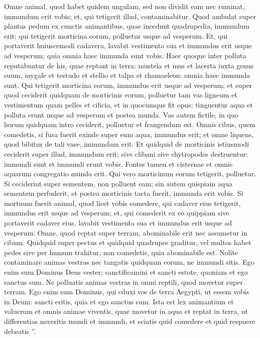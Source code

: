 \begin{biblechapter}
\begin{biblechapter}
\begin{biblechapter}
\begin{biblechapter}
\begin{biblechapter}
\begin{biblechapter}
\begin{biblechapter}
\begin{biblechapter}
\begin{biblechapter}
\begin{biblechapter}
\begin{biblechapter}
 \verse Omne animal, quod habet quidem ungulam, sed non dividit eam nec ruminat, immundum erit vobis; et, qui tetigerit illud, contaminabitur. 
\verse Quod ambulat super plantas pedum ex cunctis animantibus, quae incedunt quadrupedia, immundum erit; qui tetigerit morticina eorum, polluetur usque ad vesperum. 
 \verse Et, qui portaverit huiuscemodi cadavera, lavabit vestimenta sua et immundus erit usque ad vesperum; quia omnia haec immunda sunt vobis.
 \verse Haec quoque inter polluta reputabuntur de his, quae reptant in terra: mustela et mus et lacerta iuxta genus suum, 
\verse mygale et testudo et stellio et talpa et chamaeleon: 
\verse omnia haec immunda sunt.
 Qui tetigerit morticina eorum, immundus erit usque ad vesperum; 
\verse et super quod ceciderit quidquam de morticinis eorum, polluetur tam vas ligneum et vestimentum quam pelles et cilicia, et in quocumque fit opus; tinguentur aqua et polluta erunt usque ad vesperum et postea munda. 
\verse Vas autem fictile, in quo horum quidquam intro ceciderit, polluetur et frangendum est. 
\verse Omnis cibus, quem comedetis, si fusa fuerit exinde super eum aqua, immundus erit; et omne liquens, quod bibitur de tali vase, immundum erit. 
\verse Et quidquid de morticinis istiusmodi ceciderit super illud, immundum erit; sive clibani sive chytropodes destruentur: immundi sunt et immundi erunt vobis. 
\verse Fontes tamen et cisternae et omnis aquarum congregatio munda erit. Qui vero morticinum eorum tetigerit, polluetur. 
\verse Si ceciderint super sementem, non polluent eam; 
\verse sin autem quispiam aqua sementem perfuderit, et postea morticinis tacta fuerit, immunda erit vobis.
 \verse Si mortuum fuerit animal, quod licet vobis comedere, qui cadaver eius tetigerit, immundus erit usque ad vesperum; 
\verse et, qui comederit ex eo quippiam sive portaverit cadaver eius, lavabit vestimenta sua et immundus erit usque ad vesperum.
 \verse Omne, quod reptat super terram, abominabile erit nec assumetur in cibum. 
 \verse Quidquid super pectus et quidquid quadrupes graditur, vel multos habet pedes sive per humum trahitur, non comedetis, quia abominabile est. 
\verse Nolite contaminare animas vestras nec tangatis quidquam eorum, ne immundi sitis. 
\verse Ego enim sum Dominus Deus vester; sanctificamini et sancti estote, quoniam et ego sanctus sum. Ne polluatis animas vestras in omni reptili, quod movetur super terram. 
\verse Ego enim sum Dominus, qui eduxi vos de terra Aegypti, ut essem vobis in Deum: sancti eritis, quia et ego sanctus sum.
 \verse Ista est lex animantium et volucrum et omnis animae viventis, quae movetur in aqua et reptat in terra, 
\verse ut differentias noveritis mundi et immundi, et sciatis quid comedere et quid respuere debeatis ”.
 

\end{biblechapter}
\end{biblechapter}
\end{biblechapter}
\end{biblechapter}
\end{biblechapter}
\end{biblechapter}
\end{biblechapter}
\end{biblechapter}
\end{biblechapter}
\end{biblechapter}
\end{biblechapter}
